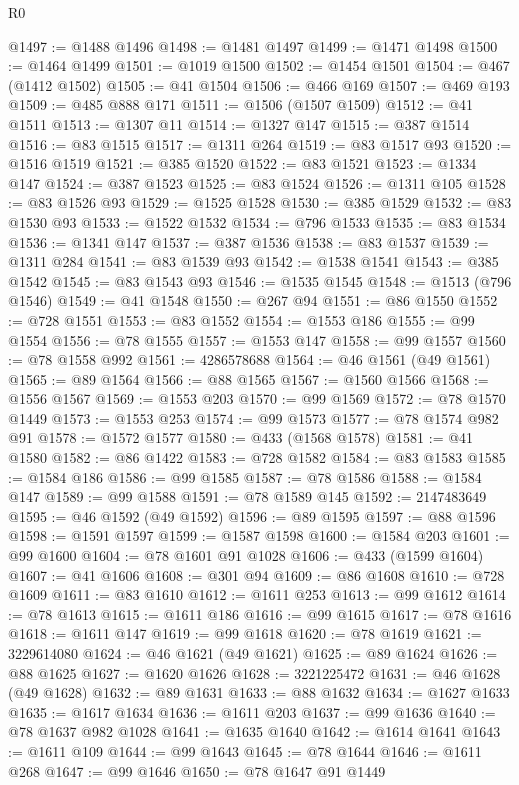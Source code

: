 \begin{lexlean}{R0}
\begin{coremodule}
@1497 := @1488 @1496
@1498 := @1481 @1497
@1499 := @1471 @1498
@1500 := @1464 @1499
@1501 := @1019 @1500
@1502 := @1454 @1501
@1504 := @467 (@1412 @1502)
@1505 := @41 @1504
@1506 := @466 @169
@1507 := @469 @193
@1509 := @485 @888 @171
@1511 := @1506 (@1507 @1509)
@1512 := @41 @1511
@1513 := @1307 @11
@1514 := @1327 @147
@1515 := @387 @1514
@1516 := @83 @1515
@1517 := @1311 @264
@1519 := @83 @1517 @93
@1520 := @1516 @1519
@1521 := @385 @1520
@1522 := @83 @1521
@1523 := @1334 @147
@1524 := @387 @1523
@1525 := @83 @1524
@1526 := @1311 @105
@1528 := @83 @1526 @93
@1529 := @1525 @1528
@1530 := @385 @1529
@1532 := @83 @1530 @93
@1533 := @1522 @1532
@1534 := @796 @1533
@1535 := @83 @1534
@1536 := @1341 @147
@1537 := @387 @1536
@1538 := @83 @1537
@1539 := @1311 @284
@1541 := @83 @1539 @93
@1542 := @1538 @1541
@1543 := @385 @1542
@1545 := @83 @1543 @93
@1546 := @1535 @1545
@1548 := @1513 (@796 @1546)
@1549 := @41 @1548
@1550 := @267 @94
@1551 := @86 @1550
@1552 := @728 @1551
@1553 := @83 @1552
@1554 := @1553 @186
@1555 := @99 @1554
@1556 := @78 @1555
@1557 := @1553 @147
@1558 := @99 @1557
@1560 := @78 @1558 @992
@1561 := 4286578688
@1564 := @46 @1561 (@49 @1561)
@1565 := @89 @1564
@1566 := @88 @1565
@1567 := @1560 @1566
@1568 := @1556 @1567
@1569 := @1553 @203
@1570 := @99 @1569
@1572 := @78 @1570 @1449
@1573 := @1553 @253
@1574 := @99 @1573
@1577 := @78 @1574 @982 @91
@1578 := @1572 @1577
@1580 := @433 (@1568 @1578)
@1581 := @41 @1580
@1582 := @86 @1422
@1583 := @728 @1582
@1584 := @83 @1583
@1585 := @1584 @186
@1586 := @99 @1585
@1587 := @78 @1586
@1588 := @1584 @147
@1589 := @99 @1588
@1591 := @78 @1589 @145
@1592 := 2147483649
@1595 := @46 @1592 (@49 @1592)
@1596 := @89 @1595
@1597 := @88 @1596
@1598 := @1591 @1597
@1599 := @1587 @1598
@1600 := @1584 @203
@1601 := @99 @1600
@1604 := @78 @1601 @91 @1028
@1606 := @433 (@1599 @1604)
@1607 := @41 @1606
@1608 := @301 @94
@1609 := @86 @1608
@1610 := @728 @1609
@1611 := @83 @1610
@1612 := @1611 @253
@1613 := @99 @1612
@1614 := @78 @1613
@1615 := @1611 @186
@1616 := @99 @1615
@1617 := @78 @1616
@1618 := @1611 @147
@1619 := @99 @1618
@1620 := @78 @1619
@1621 := 3229614080
@1624 := @46 @1621 (@49 @1621)
@1625 := @89 @1624
@1626 := @88 @1625
@1627 := @1620 @1626
@1628 := 3221225472
@1631 := @46 @1628 (@49 @1628)
@1632 := @89 @1631
@1633 := @88 @1632
@1634 := @1627 @1633
@1635 := @1617 @1634
@1636 := @1611 @203
@1637 := @99 @1636
@1640 := @78 @1637 @982 @1028
@1641 := @1635 @1640
@1642 := @1614 @1641
@1643 := @1611 @109
@1644 := @99 @1643
@1645 := @78 @1644
@1646 := @1611 @268
@1647 := @99 @1646
@1650 := @78 @1647 @91 @1449

\end{coremodule}
\end{lexlean}
